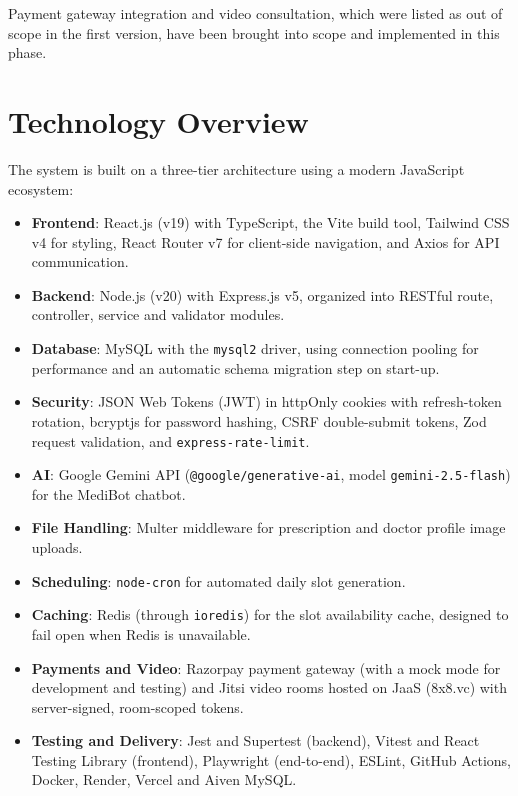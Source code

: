Payment gateway integration and video consultation, which were listed as out of scope in the first version, have been brought into scope and implemented in this phase.

\FloatBarrier
\section{Technology Overview}

The system is built on a three-tier architecture using a modern JavaScript ecosystem:

\begin{itemize}
    \item \textbf{Frontend}: React.js (v19) with TypeScript, the Vite build tool, Tailwind CSS v4 for styling, React Router v7 for client-side navigation, and Axios for API communication.
    \item \textbf{Backend}: Node.js (v20) with Express.js v5, organized into RESTful route, controller, service and validator modules.
    \item \textbf{Database}: MySQL with the \texttt{mysql2} driver, using connection pooling for performance and an automatic schema migration step on start-up.
    \item \textbf{Security}: JSON Web Tokens (JWT) in httpOnly cookies with refresh-token rotation, bcryptjs for password hashing, CSRF double-submit tokens, Zod request validation, and \texttt{express-rate-limit}.
    \item \textbf{AI}: Google Gemini API (\texttt{@google/generative-ai}, model \texttt{gemini-2.5-flash}) for the MediBot chatbot.
    \item \textbf{File Handling}: Multer middleware for prescription and doctor profile image uploads.
    \item \textbf{Scheduling}: \texttt{node-cron} for automated daily slot generation.
    \item \textbf{Caching}: Redis (through \texttt{ioredis}) for the slot availability cache, designed to fail open when Redis is unavailable.
    \item \textbf{Payments and Video}: Razorpay payment gateway (with a mock mode for development and testing) and Jitsi video rooms hosted on JaaS (8x8.vc) with server-signed, room-scoped tokens.
    \item \textbf{Testing and Delivery}: Jest and Supertest (backend), Vitest and React Testing Library (frontend), Playwright (end-to-end), ESLint, GitHub Actions, Docker, Render, Vercel and Aiven MySQL.
\end{itemize}

